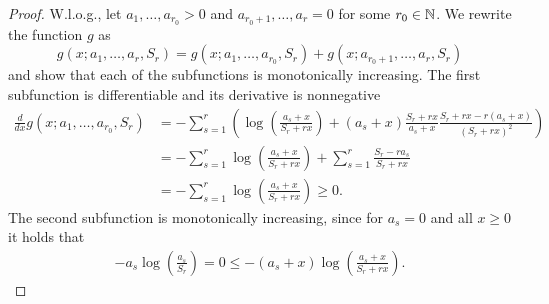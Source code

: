 \begin{proof}
W.l.o.g., let $a_1,\ldots,a_{r_0}>0$ and $a_{r_0+1},\ldots,a_r=0$ for some $r_0\in \mathbb{N}$. We rewrite the function $g$ as
\[g(x;a_1,\ldots,a_r,S_r)=g(x;a_1,\ldots,a_{r_0},S_r)+g(x;a_{r_0+1},\ldots,a_r,S_r)\]
and show that each of  the subfunctions is monotonically increasing.
The first subfunction is differentiable and its derivative is nonnegative
\begin{align*}
\frac{d}{dx}g(x;a_1,\ldots,a_{r_0},S_r) &= -\sum_{s=1}^r\left(\log\left(\frac{a_s+x}{S_r+rx}\right)+(a_s+x)\frac{S_r+rx}{a_s+x}\frac{S_r+rx-r(a_s+x)}{(S_r+rx)^2}\right)\\
&= -\sum_{s=1}^r\log\left(\frac{a_s+x}{S_r+rx}\right)+\sum_{s=1}^r\frac{S_r-ra_s}{S_r+rx}\\
&= -\sum_{s=1}^r\log\left(\frac{a_s+x}{S_r+rx}\right)\geq 0.
\end{align*}
The second subfunction is monotonically increasing, since for $a_s=0$ and all $x\geq 0$ it holds that
\begin{align*}
	-a_s\log\left(\frac{a_s}{S_r}\right)=0\leq -(a_s+x)\log\left(\frac{a_s+x}{S_r+rx}\right).
\end{align*}
\end{proof}
\BoundLCT*
